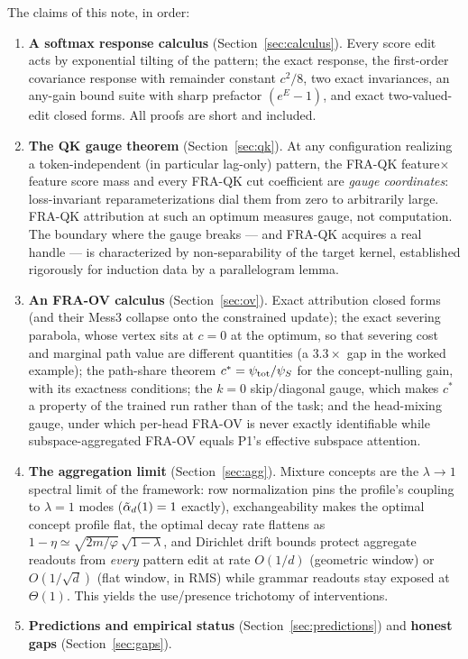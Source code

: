 \documentclass{article}
\begin{document}
The claims of this note, in order:
\begin{enumerate}
    \item \textbf{A softmax response calculus} (Section~\ref{sec:calculus}). Every score edit acts by exponential tilting of the pattern; the exact response, the first-order covariance response with remainder constant $c^2/8$, two exact invariances, an any-gain bound suite with sharp prefactor $(e^E - 1)$, and exact two-valued-edit closed forms. All proofs are short and included.
    \item \textbf{The QK gauge theorem} (Section~\ref{sec:qk}). At any configuration realizing a token-independent (in particular lag-only) pattern, the FRA-QK feature$\times$feature score mass and every FRA-QK cut coefficient are \emph{gauge coordinates}: loss-invariant reparameterizations dial them from zero to arbitrarily large. FRA-QK attribution at such an optimum measures gauge, not computation. The boundary where the gauge breaks --- and FRA-QK acquires a real handle --- is characterized by non-separability of the target kernel, established rigorously for induction data by a parallelogram lemma.
    \item \textbf{An FRA-OV calculus} (Section~\ref{sec:ov}). Exact attribution closed forms (and their Mess3 collapse onto the constrained update); the exact severing parabola, whose vertex sits at $c = 0$ at the optimum, so that severing cost and marginal path value are different quantities (a $3.3\times$ gap in the worked example); the path-share theorem $c^* = \psi_{\mathrm{tot}}/\psi_S$ for the concept-nulling gain, with its exactness conditions; the $k=0$ skip/diagonal gauge, which makes $c^*$ a property of the trained run rather than of the task; and the head-mixing gauge, under which per-head FRA-OV is never exactly identifiable while subspace-aggregated FRA-OV equals P1's effective subspace attention.
    \item \textbf{The aggregation limit} (Section~\ref{sec:agg}). Mixture concepts are the $\lambda \to 1$ spectral limit of the framework: row normalization pins the profile's coupling to $\lambda = 1$ modes ($\Tilde{\alpha}_d(1) = 1$ exactly), exchangeability makes the optimal concept profile flat, the optimal decay rate flattens as $1 - \eta \simeq \sqrt{2m/\varphi}\,\sqrt{1-\lambda}$, and Dirichlet drift bounds protect aggregate readouts from \emph{every} pattern edit at rate $O(1/d)$ (geometric window) or $O(1/\sqrt d)$ (flat window, in RMS) while grammar readouts stay exposed at $\Theta(1)$. This yields the use/presence trichotomy of interventions.
    \item \textbf{Predictions and empirical status} (Section~\ref{sec:predictions}) and \textbf{honest gaps} (Section~\ref{sec:gaps}).
\end{enumerate}
\end{document}
